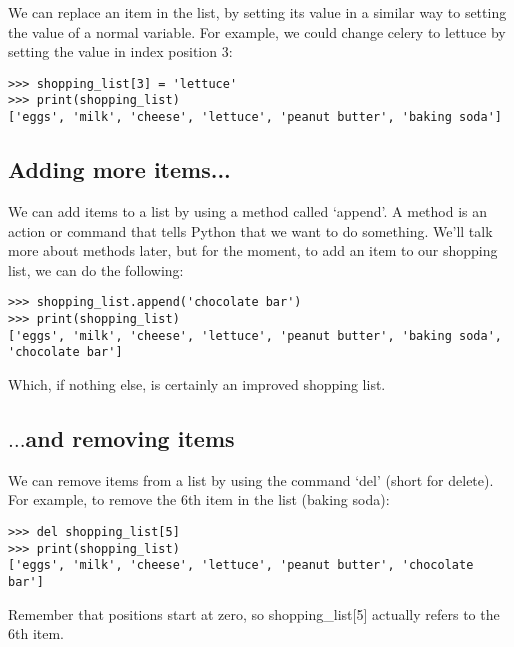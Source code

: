 We can replace an item in the list, by setting its value in a similar way to setting the value of a normal variable. For example, we could change celery to lettuce by setting the value in index position 3:

\begin{listing}
\begin{verbatim}
>>> shopping_list[3] = 'lettuce'
>>> print(shopping_list)
['eggs', 'milk', 'cheese', 'lettuce', 'peanut butter', 'baking soda']
\end{verbatim}
\end{listing}

\subsection*{\color{BrickRed}Adding more items...}

We can add items to a list by using a method called `append'.  A method is an action or command that tells Python that we want to do something.  We'll talk more about methods later, but for the moment, to add an item to our shopping list, we can do the following:

\begin{listing}
\begin{verbatim}
>>> shopping_list.append('chocolate bar')
>>> print(shopping_list)
['eggs', 'milk', 'cheese', 'lettuce', 'peanut butter', 'baking soda', 
'chocolate bar']
\end{verbatim}
\end{listing}

Which, if nothing else, is certainly an improved shopping list.

\subsection*{\color{BrickRed}$\ldots$and removing items}

We can remove items from a list by using the command `del' (short for delete).  For example, to remove the 6th item in the list (baking soda):

\begin{listing}
\begin{verbatim}
>>> del shopping_list[5]
>>> print(shopping_list)
['eggs', 'milk', 'cheese', 'lettuce', 'peanut butter', 'chocolate bar']
\end{verbatim}
\end{listing}

Remember that positions start at zero, so shopping\_list[5] actually refers to the 6th item.


